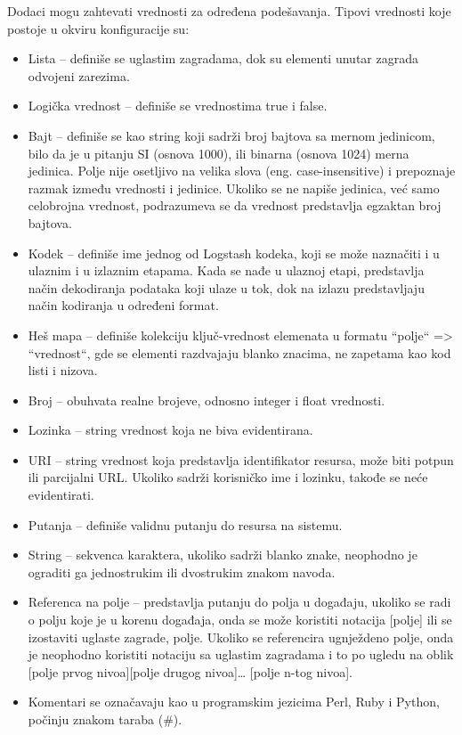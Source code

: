 Dodaci mogu zahtevati vrednosti za određena podešavanja. Tipovi vrednosti koje postoje u okviru konfiguracije su:
\begin{itemize}
    \item Lista – definiše se uglastim zagradama, dok su elementi unutar zagrada odvojeni zarezima.
    \item Logička vrednost – definiše se vrednostima true i false.
    \item Bajt – definiše se kao string koji sadrži broj bajtova sa mernom jedinicom, bilo da je u pitanju SI (osnova 1000), ili binarna (osnova 1024) merna jedinica. Polje nije osetljivo na velika slova (eng. case-insensitive) i prepoznaje razmak između vrednosti i jedinice. Ukoliko se ne napiše jedinica, već samo celobrojna vrednost, podrazumeva se da vrednost predstavlja egzaktan broj bajtova.
    \item Kodek – definiše ime jednog od Logstash kodeka, koji se može naznačiti i u ulaznim i u izlaznim etapama. Kada se nađe u ulaznoj etapi, predstavlja način dekodiranja podataka koji ulaze u tok, dok na izlazu predstavljaju način kodiranja u određeni format.
    \item Heš mapa – definiše kolekciju ključ-vrednost elemenata u formatu “polje“ => “vrednost“, gde se elementi razdvajaju blanko znacima, ne zapetama kao kod listi i nizova.
    \item Broj – obuhvata realne brojeve, odnosno integer i float vrednosti.
    \item Lozinka – string vrednost koja ne biva evidentirana.
    \item URI – string vrednost koja predstavlja identifikator resursa, može biti potpun ili parcijalni URL. Ukoliko sadrži korisničko ime i lozinku, takođe se neće evidentirati.
    \item Putanja – definiše validnu putanju do resursa na sistemu.
    \item String – sekvenca karaktera, ukoliko sadrži blanko znake, neophodno je ograditi ga jednostrukim ili dvostrukim znakom navoda.
    \item Referenca na polje – predstavlja putanju do polja u događaju, ukoliko se radi o polju koje je u korenu događaja, onda se može koristiti notacija [polje] ili se izostaviti uglaste zagrade, polje. Ukoliko se referencira ugnježdeno polje, onda je neophodno koristiti notaciju sa uglastim zagradama i to po ugledu na oblik [polje prvog nivoa][polje drugog nivoa]… [polje n-tog nivoa].
    \item Komentari se označavaju kao u programskim jezicima Perl, Ruby i Python, počinju znakom taraba (\#).
\end{itemize}

